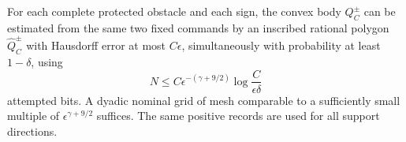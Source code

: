\begin{lemma}
\label{lem:two-field-hulls}
For each complete protected obstacle and each sign, the convex body
$Q_C^\pm$ can be estimated from the same two fixed commands by an
inscribed rational polygon $\widehat Q_C^\pm$ with Hausdorff error
at most $C\epsilon$, simultaneously with probability at least
$1-\delta$, using
\begin{equation}\label{eq:two-field-hull-cost}
 N\le C\epsilon^{-(\gamma+9/2)}
                         \log\frac C{\epsilon\delta}
\end{equation}
attempted bits.  A dyadic nominal grid of mesh comparable to a
sufficiently small multiple of $\epsilon^{\gamma+9/2}$ suffices.
The same positive records are used for all support directions.
\end{lemma}
